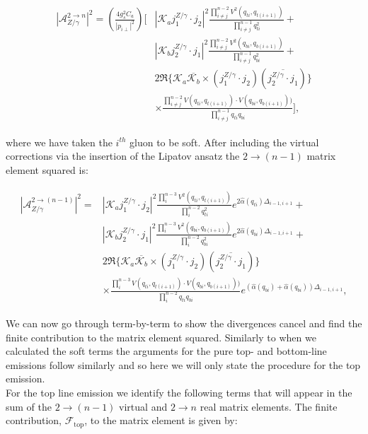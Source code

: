		\begin{align}
		\begin{split}
			|\mathcal{A}_{Z/\gamma}^{2\rightarrow n}|^2 = \left(\frac{4g_s^2C_a}{|p_{i\perp}|^2}\right)
				\Bigg[&\left|\mathcal{K}_a j_1^{Z/\gamma}\cdot j_2\right|^2
				\frac{\prod^{n-2}_{i\neq j}V^2(q_{ti},
				q_{t(i+1)})}{\prod^{n-1}_{i\neq j}q^2_{ti}} + \\
				&\left|\mathcal{K}_b j_2^{Z/\gamma}\cdot j_1\right|^2
				\frac{\prod^{n-2}_{i\neq j}V^2(q_{bi}, q_{b(i+1)})}{\prod^{n-1}_{i\neq j}q^2_{bi}} + \\
				&2\Re\{\mathcal{K}_a\overline{\mathcal{K}_b} \times
				(j_1^{Z/\gamma}\cdot j_2)(\overline{j_2^{Z/\gamma}\cdot j_1})\}\\
				&\times\frac{\prod^{n-2}_{i\neq j}V(q_{ti}, q_{t(i+1)})\cdot V(q_{bi}, q_{b(i+1)}))}
				{\prod^{n-1}_{i\neq j}q_{ti}q_{bi}}\Bigg],
		\end{split}
		\end{align}

		where we have taken the $i^{th}$ gluon to be soft.  After including the virtual corrections
		via the insertion of the Lipatov ansatz the $2\rightarrow (n-1)$ matrix element squared is:

		\begin{align}
		\begin{split}
			|\mathcal{A}_{Z/\gamma}^{2\rightarrow (n-1)}|^2 = &\left|\mathcal{K}_a j_1^{Z/\gamma}\cdot j_2\right|^2
				\frac{\prod^{n-3}_{i}V^2(q_{ti}, q_{t(i+1)})}{\prod^{n-2}_{i}q^2_{ti}}e^{2\hat{\alpha}(q_{ti})\Delta_{i-1,i+1}} + \\
				&\left|\mathcal{K}_b j_2^{Z/\gamma}\cdot j_1\right|^2 \frac{\prod^{n-3}_{i}V^2(q_{bi}, q_{b(i+1)})}
				{\prod^{n-2}_{i}q^2_{bi}}e^{2\hat{\alpha}(q_{bi})\Delta_{i-1,i+1}} + \\
				&2\Re\{\mathcal{K}_a\overline{\mathcal{K}_b} \times (j_1^{Z/\gamma}\cdot j_2)(\overline{j_2^{Z/\gamma}\cdot j_1})\}\\
				&\times\frac{\prod^{n-3}_{i}V(q_{ti}, q_{t(i+1)})\cdot V(q_{bi}, q_{b(i+1)}))}{\prod^{n-2}_{i}q_{ti}q_{bi}}
				e^{(\hat{\alpha}(q_{bi}) + \hat{\alpha}(q_{bi}))\Delta_{i-1,i+1}},
		\end{split}
		\end{align}

		We can now go through term-by-term to show the divergences cancel and find the finite contribution to
		the matrix element squared.  Similarly to when we calculated the soft terms the arguments for the pure
		top- and bottom-line emissions follow similarly and so here we will only state the procedure for
		the top emission.\\For the top line emission we identify the following terms that will appear in the
		sum of the $2\rightarrow (n-1)$ virtual and $2\rightarrow n$ real matrix elements.  The finite
		contribution, $\mathcal{F}_{\text{top}}$, to the matrix element is given by:

